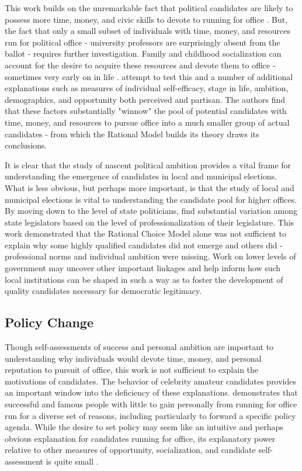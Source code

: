 This work builds on the unremarkable fact that political candidates are likely 
to possess more time, money, and civic skills to 
devote to running for office \citep{Verba1}. But, the fact that only a small subset 
of individuals with time, money, and resources run for political office - university 
professors are surprisingly absent from the ballot - requires further investigation. 
Family and childhood socialization can account for the desire to acquire these 
resources and devote them to office - sometimes very early on in life \citep{prewitt1, beckjennings}. 
\citet{AJPS:AJPS147} attempt to test this and a number of additional explanations 
such as measures of individual self-efficacy, stage in life, ambition, demographics, 
and opportunity both perceived and partisan. The authors find that these factors 
substantially "winnow" the pool of potential candidates with time, money, and resources to 
pursue office into a much smaller group of actual candidates - from which the Rational Model builds its 
theory draws its conclusions. 

It is clear that the study of nascent political ambition provides a vital frame for understanding 
the emergence of candidates in local and municipal elections. What is less obvious, 
but perhaps more important, is that the study of local and municipal elections is 
vital to understanding the candidate pool for higher offices. By moving down to the level of state politicians, \citet{MaestasEtAl} 
find substantial variation among state legislators based on the level of professionalization 
of their legislature. This work demonstrated that the Rational Choice Model alone 
was not sufficient to explain why some highly qualified candidates did not emerge 
and others did - professional norms and individual ambition were missing. Work on 
lower levels of government may uncover other important linkages and help inform how 
such local institutions can be shaped in such a way as to foster the development 
of quality candidates necessary for democratic legitimacy. 


\subsection{Policy Change}

Though self-assessments of success and personal ambition are important to understanding 
why individuals would devote time, money, and personal reputation to pursuit of 
office, this work is not sufficient to explain the motivations of candidates. The 
behavior of celebrity amateur candidates provides an important window into the 
deficiency of these explanations. \citet{CanonBook} demonstrates that successful 
and famous people with little to gain personally from running for office run for a
diverse set of reasons, including particularly to forward a specific policy agenda. While the
desire to set policy may seem like an intuitive and perhaps obvious explanation for 
candidates running for office, its explanatory power relative to other measures of 
opportunity, socialization, and candidate self-assessment is quite small \citep{AJPS:AJPS147}. 

